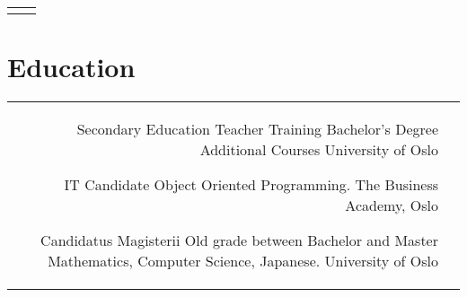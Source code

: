 \documentclass[10pt]{article} %
\begin{document}
\begin{paracol}{2}
\begin{supertabular}{rl}
	
\end{supertabular}





\section{Education} 





\begin{supertabular}{rl} %

	
	{Secondary Education Teacher Training} %
	{Bachelor's Degree Additional Courses} %
	{} %
	{University of Oslo} %
	
	{IT Candidate} %
	{} %
	{Object Oriented Programming.} %
	{The Business Academy, Oslo} %
	
	{Candidatus Magisterii} %
	{Old grade between Bachelor and Master} %
	{Mathematics, Computer Science, Japanese.} %
	{University of Oslo} %



\end{supertabular}




\end{paracol}
\end{document}
